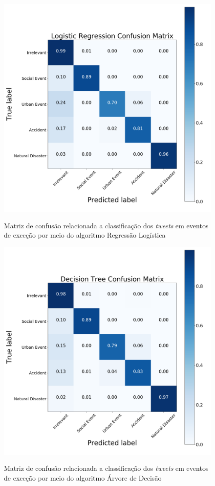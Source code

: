 \documentclass[
	12pt,				%
	oneside,			%
	a4paper,			%
	english,			%
	brazil				%
	]{abntex2ppgsi}
\begin{document}
\begin{apendicesenv}
\begin{figure}[!htb]
	\centering
 	  \caption{Matriz de confusão relacionada a classificação dos \textit{tweets} em eventos de exceção por meio do algoritmo Regressão Logística}
		\includegraphics[width=1\linewidth]{images/confusion_matrix_rl.png}
	\label{fig:confusion_matrix_rl}
\end{figure}

\begin{figure}[!htb]
	\centering
 	  \caption{Matriz de confusão relacionada a classificação dos \textit{tweets} em eventos de exceção por meio do algoritmo Árvore de Decisão}
		\includegraphics[width=1\linewidth]{images/confusion_matrix_dt.png}
	\label{fig:confusion_matrix_dt}
\end{figure}


\end{apendicesenv}
\end{document}
